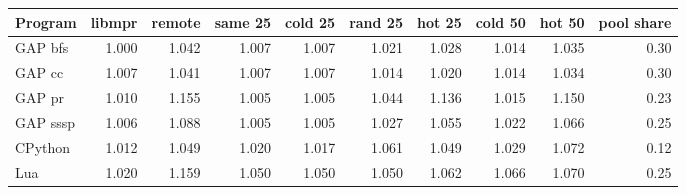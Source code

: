 \begin{tabular}{lrrrrrrrrr}
\toprule
Program & libmpr & remote & same 25 & cold 25 & rand 25 & hot 25 & cold 50 & hot 50 & pool share \\
\midrule
GAP bfs & 1.000 & 1.042 & 1.007 & 1.007 & 1.021 & 1.028 & 1.014 & 1.035 & 0.30 \\
GAP cc & 1.007 & 1.041 & 1.007 & 1.007 & 1.014 & 1.020 & 1.014 & 1.034 & 0.30 \\
GAP pr & 1.010 & 1.155 & 1.005 & 1.005 & 1.044 & 1.136 & 1.015 & 1.150 & 0.23 \\
GAP sssp & 1.006 & 1.088 & 1.005 & 1.005 & 1.027 & 1.055 & 1.022 & 1.066 & 0.25 \\
CPython & 1.012 & 1.049 & 1.020 & 1.017 & 1.061 & 1.049 & 1.029 & 1.072 & 0.12 \\
Lua & 1.020 & 1.159 & 1.050 & 1.050 & 1.050 & 1.062 & 1.066 & 1.070 & 0.25 \\
\bottomrule
\end{tabular}
